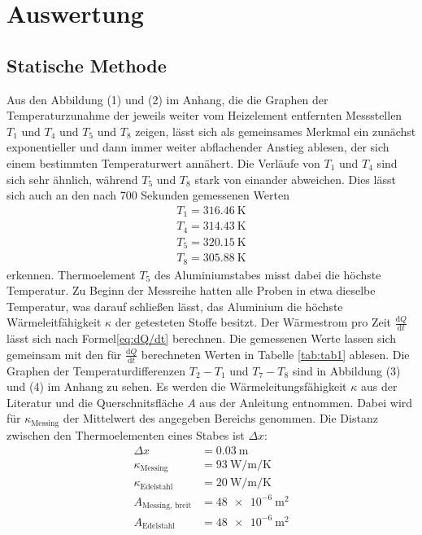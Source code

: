 \section{Auswertung}
\label{sec:Auswertung}


\subsection{Statische Methode}

Aus den Abbildung (1) und (2) im Anhang, die die Graphen der Temperaturzunahme der jeweils weiter vom Heizelement entfernten Messstellen $T_\text{1}$ und $T_\text{4}$ und $T_\text{5}$ und $T_\text{8}$ zeigen, lässt sich als gemeinsames Merkmal ein zunächst exponentieller und dann immer weiter abflachender Anstieg ablesen, der sich einem bestimmten Temperaturwert annähert.
Die Verläufe von $T_\text{1}$ und $T_\text{4}$ sind sich sehr ähnlich, während $T_\text{5}$ und $T_\text{8}$ stark von einander abweichen.\newline
Dies lässt sich auch an den nach 700 Sekunden gemessenen Werten
\begin{align*}
T_\text{1}=\SI{316.46}{\kelvin}\\
T_\text{4}=\SI{314.43}{\kelvin}\\
T_\text{5}=\SI{320.15}{\kelvin}\\
T_\text{8}=\SI{305.88}{\kelvin}
\end{align*}
erkennen.
Thermoelement $T_\text{5}$ des Aluminiumstabes misst dabei die höchste Temperatur.
Zu Beginn der Messreihe hatten alle Proben in etwa dieselbe Temperatur, was darauf schließen lässt, das Aluminium die höchste Wärmeleitfähigkeit $\kappa$ der getesteten Stoffe besitzt.
Der Wärmestrom pro Zeit $\frac{\mathrm{d}Q}{\mathrm{d}t}$
lässt sich nach Formel\eqref{eq:dQ/dt} berechnen. Die gemessenen Werte lassen sich gemeinsam mit den für $\frac{\mathrm{d}Q}{\mathrm{d}t}$ berechneten Werten in Tabelle \ref{tab:tab1} ablesen. Die Graphen der Temperaturdifferenzen $T_\text{2}-T_\text{1}$ und $T_\text{7}-T_\text{8}$ sind in Abbildung (3) und (4) im Anhang zu sehen.
Es werden die Wärmeleitungsfähigkeit $\kappa$ aus der Literatur\cite{kappa} und die Querschnitsfläche $A$ aus der Anleitung\cite{V204} entnommen. Dabei wird für $\kappa_\text{Messing}$ der Mittelwert des angegeben Bereichs genommen.
Die Distanz zwischen den Thermoelementen eines Stabes ist $\Delta x$:
\begin{align*}
\Delta x 			&= \SI{0.03}{\metre}\\
\kappa_\text{Messing}	&= \SI{93}{\watt\per\metre\per\kelvin}\\
\kappa_\text{Edelstahl}	&= \SI{20}{\watt\per\metre\per\kelvin}\\
A_\text{Messing, breit} 	&= \SI{ 48e-6}{\metre\squared} \\
A_\text{Edelstahl} 		&= \SI{ 48e-6}{\metre\squared}
\end{align*}

